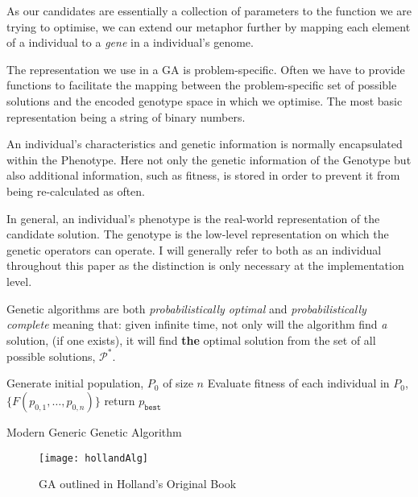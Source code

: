 As our candidates are essentially a collection of parameters to the function we are trying to optimise, we can extend our metaphor further by mapping each element of a individual to a \textit{gene} in a individual's genome. 

The representation we use in a GA is problem-specific. Often we have to provide functions to facilitate the mapping between the problem-specific set of possible solutions and the encoded genotype space in which we optimise. The most basic representation being a string of binary numbers.

An individual's characteristics and genetic information is normally encapsulated within the Phenotype. Here not only the genetic information of the Genotype but also additional information, such as fitness, is stored in order to prevent it from being re-calculated as often.

In general, an individual's phenotype is the real-world representation of the candidate solution. The genotype is the low-level representation on which the genetic operators can operate. I will generally refer to both as an individual throughout this paper as the distinction is only necessary at the implementation level.

Genetic algorithms are both \textit{probabilistically optimal} and \textit{probabilistically complete}\cite{kalaOnroadIntelligentVehicles2016} meaning that: given infinite time, not only will the algorithm find \textit{a} solution, (if one exists), it will find \textbf{the} optimal solution from the set of all possible solutions, $\mathcal{P}^*$.

\begin{algorithm}[H]
	\label{alg:GenericGA}
	\SetAlgoLined
	Generate initial population, $P_0$ of size $n$\;
	Evaluate fitness of each individual in $P_0$, $\{F(p_{0,1},\ldots, p_{0,n})\}$\;
	return $p_{\texttt{best}}$

	\caption{Modern Generic Genetic Algorithm}
\end{algorithm}

\begin{figure}[htpb]
    \centering
    \texttt{[image: hollandAlg]}
    \caption{GA outlined in Holland's Original Book\cite{hollandAdaptationNaturalArtificial1992}}
    \label{fig:hollandAlg}
\end{figure}

